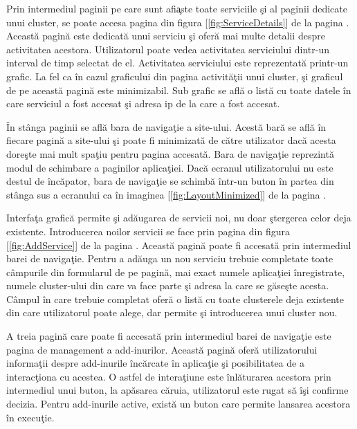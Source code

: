 \documentclass[a4paper,12pt]{report}
\let\oldref\ref
\renewcommand{\ref}[1]{[\oldref{#1}]}
\begin{document}
Prin intermediul paginii pe care sunt afi\c aste toate serviciile \c si al paginii dedicate unui cluster, se poate 
accesa pagina din figura \ref{fig:ServiceDetails} de la pagina \pageref{fig:ServiceDetails}. Aceast\u a pagin\u a
este dedicat\u a unui serviciu \c si ofer\u a mai multe detalii despre activitatea acestora. Utilizatorul poate 
vedea activitatea serviciului dintr-un interval de timp selectat de el. Activitatea serviciului este reprezentat\u a 
printr-un grafic. La fel ca \^in cazul graficului din pagina activit\u a\c tii unui cluster, \c si graficul 
de pe aceast\u a pagin\u a este minimizabil. Sub grafic se afl\u a o list\u a cu toate datele \^in care serviciul 
a fost accesat \c si adresa ip de la care a fost accesat.

\^In st\^anga paginii se afl\u a bara de naviga\c tie a site-ului. Acest\u a bar\u a se afl\u a \^in fiecare pagin\u a a site-ului
\c si poate fi minimizat\u a de c\u atre utilizator dac\u a acesta dore\c ste mai mult spa\c tiu pentru pagina accesat\u a.
Bara de naviga\c tie reprezint\u a modul de schimbare a paginilor aplica\c tiei. Dac\u a ecranul utilizatorului nu este destul de 
\^inc\u apator, bara de naviga\c tie se schimb\u a \^intr-un buton \^in partea din st\^anga sus a ecranului ca \^in imaginea 
\ref{fig:LayoutMinimized} de la pagina \pageref{fig:LayoutMinimized}.

Interfa\c ta grafic\u a permite \c si ad\u augarea de servicii noi, nu doar \c stergerea celor deja existente.
Introducerea noilor servicii se face prin pagina din figura \ref{fig:AddService} de la pagina \pageref{fig:AddService}.
Aceast\u a pagin\u a poate fi accesat\u a prin intermediul barei de naviga\c tie.
Pentru a ad\u auga un nou serviciu trebuie completate toate c\^ampurile din formularul de pe pagin\u a, mai exact 
numele aplica\c tiei \^inregistrate, numele cluster-ului din care va face parte \c si adresa la care se g\u ase\c ste acesta.
C\^ampul \^in care trebuie completat ofer\u a o list\u a cu toate clusterele deja existente din care utilizatorul poate 
alege, dar permite \c si introducerea unui cluster nou.

A treia pagin\u a care poate fi accesat\u a prin intermediul barei de naviga\c tie este pagina de management a add-inurilor.
Aceast\u a pagin\u a ofer\u a utilizatorului informa\c tii despre add-inurile \^inc\u arcate \^in aplica\c tie \c si 
posibilitatea de a interac\c tiona cu acestea. O astfel de intera\c tiune este \^inl\u aturarea acestora
prin intermediul unui buton, la ap\u asarea c\u aruia, utilizatorul este rugat s\u a \^i\c si confirme decizia.
Pentru add-inurile active, exist\u a un buton care permite lansarea acestora \^in execu\c tie.
\end{document}

